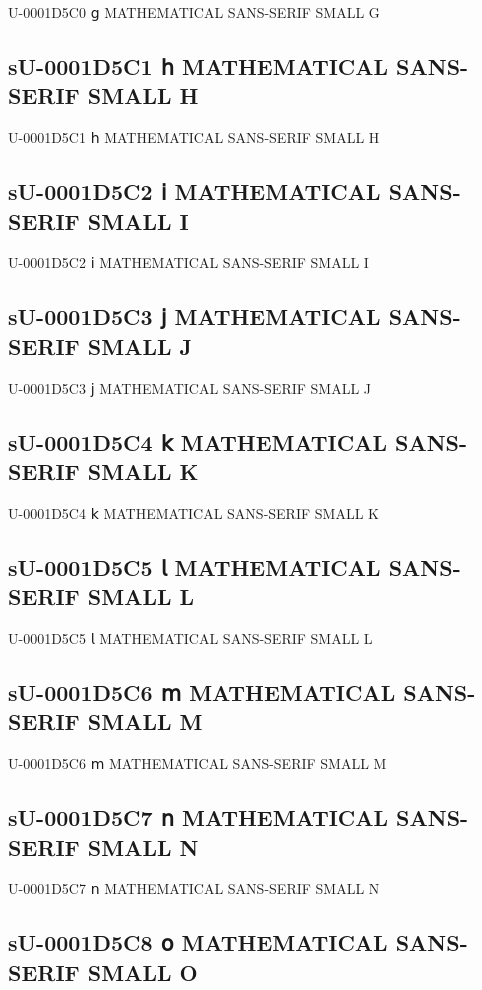 U-0001D5C0 𝗀 MATHEMATICAL SANS-SERIF SMALL G

\subsection{sU-0001D5C1 𝗁 MATHEMATICAL SANS-SERIF SMALL H}

U-0001D5C1 𝗁 MATHEMATICAL SANS-SERIF SMALL H

\subsection{sU-0001D5C2 𝗂 MATHEMATICAL SANS-SERIF SMALL I}

U-0001D5C2 𝗂 MATHEMATICAL SANS-SERIF SMALL I

\subsection{sU-0001D5C3 𝗃 MATHEMATICAL SANS-SERIF SMALL J}

U-0001D5C3 𝗃 MATHEMATICAL SANS-SERIF SMALL J

\subsection{sU-0001D5C4 𝗄 MATHEMATICAL SANS-SERIF SMALL K}

U-0001D5C4 𝗄 MATHEMATICAL SANS-SERIF SMALL K

\subsection{sU-0001D5C5 𝗅 MATHEMATICAL SANS-SERIF SMALL L}

U-0001D5C5 𝗅 MATHEMATICAL SANS-SERIF SMALL L

\subsection{sU-0001D5C6 𝗆 MATHEMATICAL SANS-SERIF SMALL M}

U-0001D5C6 𝗆 MATHEMATICAL SANS-SERIF SMALL M

\subsection{sU-0001D5C7 𝗇 MATHEMATICAL SANS-SERIF SMALL N}

U-0001D5C7 𝗇 MATHEMATICAL SANS-SERIF SMALL N

\subsection{sU-0001D5C8 𝗈 MATHEMATICAL SANS-SERIF SMALL O}

